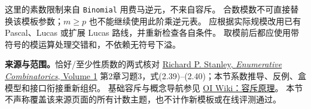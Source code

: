 这里的素数限制来自 \texttt{Binomial} 用费马逆元，不来自容斥。
合数模数不可直接替换该模板参数；$m\ge p$ 也不能继续使用此阶乘逆元表。
应根据实际规模改用已有 Pascal、Lucas 或扩展 Lucas 路线，并重新检查各自条件。
取模前后都应使用带符号的模运算处理交错和，不依赖无符号下溢。

\textbf{来源与范围。}恰好/至少性质数的两式核对
\href{https://math.mit.edu/~rstan/ec/ec1.pdf}{Richard P. Stanley, \emph{Enumerative Combinatorics}, Volume 1}
第2章习题3，式(2.39)--(2.40)；本节系数推导、反例、盒模型和接口衔接重新组织。
基础容斥与概念导航参见
\href{https://oi-wiki.org/math/combinatorics/inclusion-exclusion-principle/}{OI Wiki：容斥原理}。
本节不声称覆盖该来源页面的所有计数主题，也不计作新模板或在线评测通过。
